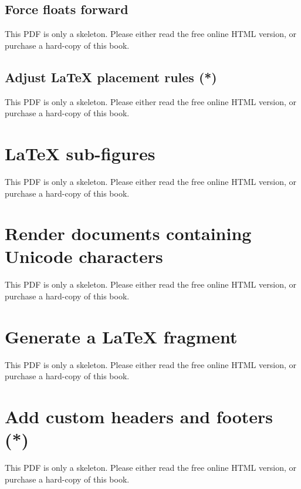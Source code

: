 \documentclass[
  11pt,
]{krantz}
\begin{document}
\subsection{Force floats forward}\label{force-floats-forward}

This PDF is only a skeleton. Please either read the free online HTML version, or purchase a hard-copy of this book.

\subsection{Adjust LaTeX placement rules (*)}\label{adjust-latex-placement-rules}

This PDF is only a skeleton. Please either read the free online HTML version, or purchase a hard-copy of this book.

\begin{table}\caption{\label{tab:float-default}Default LaTeX float settings.}\end{table}

\section{LaTeX sub-figures}\label{latex-subfigure}

This PDF is only a skeleton. Please either read the free online HTML version, or purchase a hard-copy of this book.

\section{Render documents containing Unicode characters}\label{latex-unicode}

This PDF is only a skeleton. Please either read the free online HTML version, or purchase a hard-copy of this book.

\section{Generate a LaTeX fragment}\label{latex-fragment}

This PDF is only a skeleton. Please either read the free online HTML version, or purchase a hard-copy of this book.

\section{Add custom headers and footers (*)}\label{latex-header}

This PDF is only a skeleton. Please either read the free online HTML version, or purchase a hard-copy of this book.
\end{document}
